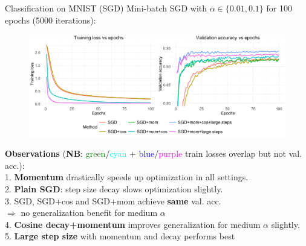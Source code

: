 \documentclass[11pt,compress,t,notes=noshow, xcolor=table]{beamer}
\begin{document}
\begin{vbframe}{Classification on MNIST (SGD)}
\vspace{-0.3cm}
Mini-batch SGD with $\alpha \in \{0.01, 0.1\}$ for 100 epochs (5000 iterations):
\begin{figure}
            \includegraphics[width=1.0\textwidth]{figure_man/simu_mnist/SGD_compar.pdf} \\
\end{figure}
\vspace{-0.2cm}
\textbf{Observations} 
{\footnotesize
(\textbf{NB}: \textcolor{green}{green}/\textcolor{cyan}{cyan} + \textcolor{blue}{blue}/\textcolor{magenta}{purple} train losses overlap but not val. acc.):\\ 
1. \textbf{Momentum} drastically speeds up optimization in all settings.\\
2. \textbf{Plain SGD}: step size decay slows optimization slightly. \\
3. SGD, SGD+cos and SGD+mom achieve \textbf{same} val. acc. \\
$\Rightarrow$ no generalization benefit for medium $\alpha$\\
4. \textbf{Cosine decay+momentum} improves generalization for medium $\alpha$ slightly. \\
5. \textbf{Large step size} with momentum and decay performs best}
\end{vbframe}
\end{document}
